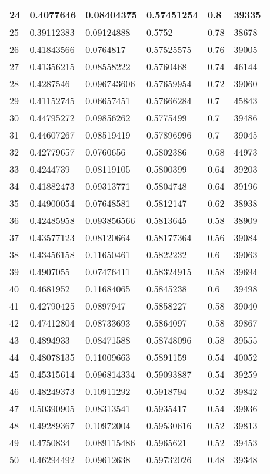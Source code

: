 \begin{longtable}{|l|l|l|l|l|l|}
24 & 0.4077646 & 0.08404375 & 0.57451254 & 0.8 & 39335 \\ \hline 
25 & 0.39112383 & 0.09124888 & 0.5752 & 0.78 & 38678 \\ \hline 
26 & 0.41843566 & 0.0764817 & 0.57525575 & 0.76 & 39005 \\ \hline 
27 & 0.41356215 & 0.08558222 & 0.5760468 & 0.74 & 46144 \\ \hline 
28 & 0.4287546 & 0.096743606 & 0.57659954 & 0.72 & 39060 \\ \hline 
29 & 0.41152745 & 0.06657451 & 0.57666284 & 0.7 & 45843 \\ \hline 
30 & 0.44795272 & 0.09856262 & 0.5775499 & 0.7 & 39486 \\ \hline 
31 & 0.44607267 & 0.08519419 & 0.57896996 & 0.7 & 39045 \\ \hline 
32 & 0.42779657 & 0.0760656 & 0.5802386 & 0.68 & 44973 \\ \hline 
33 & 0.4244739 & 0.08119105 & 0.5800399 & 0.64 & 39203 \\ \hline 
34 & 0.41882473 & 0.09313771 & 0.5804748 & 0.64 & 39196 \\ \hline 
35 & 0.44900054 & 0.07648581 & 0.5812147 & 0.62 & 38938 \\ \hline 
36 & 0.42485958 & 0.093856566 & 0.5813645 & 0.58 & 38909 \\ \hline 
37 & 0.43577123 & 0.08120664 & 0.58177364 & 0.56 & 39084 \\ \hline 
38 & 0.43456158 & 0.11650461 & 0.5822232 & 0.6 & 39063 \\ \hline 
39 & 0.4907055 & 0.07476411 & 0.58324915 & 0.58 & 39694 \\ \hline 
40 & 0.4681952 & 0.11684065 & 0.5845238 & 0.6 & 39498 \\ \hline 
41 & 0.42790425 & 0.0897947 & 0.5858227 & 0.58 & 39040 \\ \hline 
42 & 0.47412804 & 0.08733693 & 0.5864097 & 0.58 & 39867 \\ \hline 
43 & 0.4894933 & 0.08471588 & 0.58748096 & 0.58 & 39555 \\ \hline 
44 & 0.48078135 & 0.11009663 & 0.5891159 & 0.54 & 40052 \\ \hline 
45 & 0.45315614 & 0.096814334 & 0.59093887 & 0.54 & 39259 \\ \hline 
46 & 0.48249373 & 0.10911292 & 0.5918794 & 0.52 & 39842 \\ \hline 
47 & 0.50390905 & 0.08313541 & 0.5935417 & 0.54 & 39936 \\ \hline 
48 & 0.49289367 & 0.10972004 & 0.59530616 & 0.52 & 39813 \\ \hline 
49 & 0.4750834 & 0.089115486 & 0.5965621 & 0.52 & 39453 \\ \hline 
50 & 0.46294492 & 0.09612638 & 0.59732026 & 0.48 & 39348 \\ \hline 
\end{longtable}